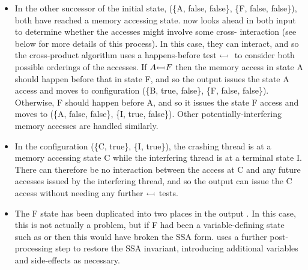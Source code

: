 \begin{itemize}
\item In the other successor of the initial state, (\{A, false,
  false\}, \{F, false, false\}), both {\StateMachines} have reached a
  memory accessing state.  {\Technique} now looks ahead in both input
  {\StateMachines} to determine whether the accesses might involve
  some cross-{\StateMachine} interaction (see below for more details
  of this process).  In this case, they can interact, and so the
  cross-product algorithm uses a happens-before test
  $\leftarrowtail{}$ to consider both possible orderings of the
  accesses.  If $A {\leftarrowtail} F$ then the memory access in state
  A should happen before that in state F, and so the output
  {\StateMachine} issues the state A access and moves to configuration
  (\{B, true, false\}, \{F, false, false\}).  Otherwise, F should
  happen before A, and so it issues the state F access and moves to
  (\{A, false, false\}, \{I, true, false\}).  Other
  potentially-interfering memory accesses are handled similarly.

\item In the configuration (\{C, true\}, \{I, true\}), the crashing
  thread {\StateMachine} is at a memory accessing state C while the
  interfering thread {\StateMachine} is at a terminal state I.  There
  can therefore be no interaction between the access at C and any
  future accesses issued by the interfering thread, and so the output
  {\StateMachine} can issue the C access without needing any further
  $\leftarrowtail$ tests.

\item The F state has been duplicated into two places in the output
  {\StateMachine}.  In this case, this is not actually a problem, but
  if F had been a variable-defining state such as  or
   then this would have broken the SSA form.  {\Technique}
  uses a further post-processing step to restore the SSA invariant,
  introducing additional variables and \state{$\Phi$} side-effects as
  necessary.
\end{itemize}

